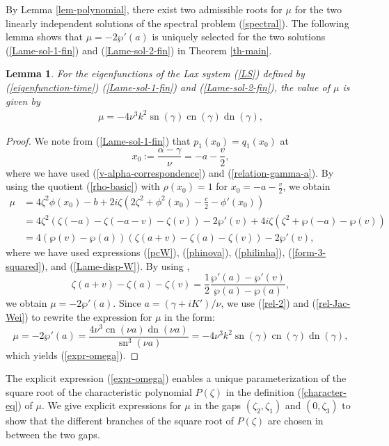 \documentclass[12pt,reqno]{amsart}
\numberwithin{equation}{section}
\DeclareMathOperator{\sn}{sn}
\DeclareMathOperator{\cn}{cn}
\DeclareMathOperator{\dn}{dn}
\newtheorem{lemma}{Lemma}
\begin{document}
	By Lemma \ref{lem-polynomial}, there exist two admissible roots for $\mu$ 
for the two linearly independent solutions of the spectral problem (\ref{spectral}). The following lemma shows that $\mu = -2 \wp'(a)$ is uniquely selected for the two solutions (\ref{Lame-sol-1-fin}) and (\ref{Lame-sol-2-fin}) in Theorem \ref{th-main}.

\begin{lemma}
\label{lem-mu}
For the eigenfunctions of the Lax system (\ref{LS}) defined by (\ref{eigenfunction-time}) 
(\ref{Lame-sol-1-fin}) and (\ref{Lame-sol-2-fin}), 
the value of $\mu$ is given by 
\begin{align}
\label{expr-omega}
\mu = -4 \nu^3 k^2 \sn(\gamma) \cn(\gamma) \dn(\gamma), 
\end{align}
\end{lemma}

\begin{proof}
We  note from (\ref{Lame-sol-1-fin}) that $p_1(x_0) = q_1(x_0)$ at 
$$
x_0 := \frac{\alpha - \gamma}{\nu} = -a - \frac{v}{2},
$$
where we have used (\ref{v-alpha-correspondence}) and (\ref{relation-gamma-a}). 
By using the quotient (\ref{rho-basic}) with $\rho(x_0) = 1$ for $x_0 = -a -\frac{v}{2}$, we obtain 
\begin{align*}
\mu &= 4 \zeta^2 \phi(x_0) - b + 2i \zeta \left( 2 \zeta^2 + \phi^2(x_0) - \frac{c}{2} - \phi'(x_0) \right) \\
&= 4 \zeta^2 (\zeta(-a) - \zeta(-a-v) - \zeta(v)) - 2 \wp'(v) 
+ 4i \zeta ( \zeta^2 + \wp(-a) - \wp(v)) \\
&= 4 (\wp(v) - \wp(a)) (\zeta(a+v) - \zeta(a) - \zeta(v)) - 2 \wp'(v), 
\end{align*}
where we have used expressions (\ref{pcW}), (\ref{phinova}), (\ref{philinha}), (\ref{form-3-squared}), and (\ref{Lame-disp-W}). 
By using \cite[8.177]{GR}, 
$$
\zeta(a+v) - \zeta(a) - \zeta(v) = \frac{1}{2} \frac{\wp'(a) - \wp'(v)}{\wp(a) - \wp(a)},
$$
we obtain $\mu = -2 \wp'(a)$. Since $a = (\gamma + i K')/\nu$, we use 
(\ref{rel-2}) and (\ref{rel-Jac-Wei}) to rewrite the expression for $\mu$ in the form:
$$
\mu = -2 \wp'(a) = \frac{4 \nu^3 \cn(\nu a) \dn(\nu a)}{\sn^3(\nu a)} = -4 \nu^3 k^2 \sn(\gamma) \cn(\gamma) \dn(\gamma), 
$$
which yields (\ref{expr-omega}).
\end{proof}


The explicit expression (\ref{expr-omega}) enables a unique parameterization of the square root of the characteristic polynomial $P(\zeta)$ in the definition 
(\ref{character-eq}) of $\mu$. We give explicit expressions 
for $\mu$ in the gaps $(\zeta_2,\zeta_1)$ and $(0,\zeta_3)$ to show that 
the different branches of the square root of $P(\zeta)$ are chosen in between the two gaps. 
\end{document}
